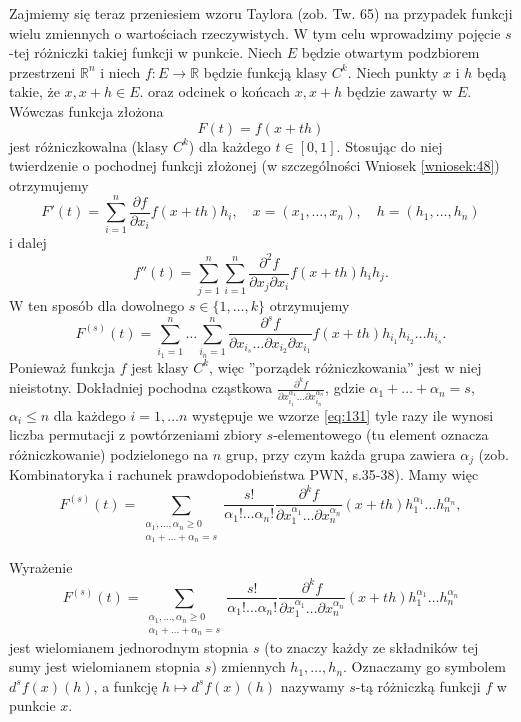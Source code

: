 \documentclass[leqno]{article}
\begin{document}
\begin{justify}
Zajmiemy się teraz przeniesiem wzoru Taylora (zob. Tw. 65) na przypadek funkcji wielu zmiennych o wartościach rzeczywistych. W tym celu wprowadzimy pojęcie $s$-tej różniczki takiej funkcji w punkcie.
Niech $E$ będzie otwartym podzbiorem przestrzeni $\mathbb{R}^n$ i niech $f : E \to \mathbb{R}$ będzie funkcją klasy $C^k$. Niech punkty $x$ i $h$ będą takie, że $x, x+h \in E$.
oraz odcinek o końcach $x,x+h$ będzie zawarty w $E$. Wówczas funkcja złożona 
\[
    F(t) = f(x + th)
\]
jest różniczkowalna (klasy $C^k$) dla każdego $t \in [0,1]$. Stosując do niej twierdzenie o pochodnej funkcji złożonej (w szczególności Wniosek \ref{wniosek:48}) otrzymujemy 
\[
    F'(t) = \sum_{i=1}^{n}\frac{\partial f}{\partial x_i}f(x+th)h_i, \quad x = (x_1, \ldots, x_n), \quad h = (h_1, \ldots, h_n)
\]
i dalej 
\[
    f''(t) = \sum_{j=1}^{n} \sum_{i=1}^{n} \frac{\partial ^2 f}{\partial x_j \partial x_i} f(x+th) h_i h_j.
\]
W ten sposób dla dowolnego $s \in \{1, \ldots, k\}$ otrzymujemy 
\begin{equation}\label{eq:131}
    F^{(s)} (t) = \sum_{i_1 = 1}^{n} \ldots \sum_{i_n = 1}^{n}\frac{\partial ^s f}{\partial x_{i_s} \ldots \partial x_{i_2}\partial x_{i_1}}f(x+th) h_{i_1} h_{i_2} \ldots h_{i_s}.
\end{equation}
Ponieważ funkcja $f$ jest klasy $C^k$, więc ''porządek różniczkowania'' jest w niej nieistotny. Dokładniej pochodna cząstkowa 
$\frac{\partial ^k f}{\partial x_{i_1}^{\alpha_1}\ldots \partial x_{i_{n}}^{\alpha_n}}$, gdzie $\alpha_1 + \ldots + \alpha_n = s$, $\alpha_i \leqslant n$ dla każdego $i = 1, \ldots n$ 
występuje we wzorze \ref{eq:131} tyle razy ile wynosi liczba permutacji z powtórzeniami zbiory $s$-elementowego (tu element oznacza różniczkowanie) podzielonego na $n$ grup,
przy czym każda grupa zawiera $\alpha_j$ (zob. Kombinatoryka i rachunek prawdopodobieństwa PWN, s.35-38). Mamy więc 
\[
    F^{(s)}(t) = \sum_{\substack{\alpha_1, \ldots, \alpha_n \geqslant 0 \\ \alpha_1 + \ldots + \alpha_n = s}}\frac{s!}{\alpha_1! \ldots \alpha_n!}\frac{\partial ^k f}{\partial x_1^{\alpha_1} \ldots \partial x_n^{\alpha_n}}(x+th)h_1^{\alpha_1}\ldots h_n^{\alpha_n},
\]

\begin{defn}
    Wyrażenie 
    \begin{equation}\label{eq:132}
        F^{(s)}(t) = \sum_{\substack{\alpha_1, \ldots, \alpha_n \geqslant 0 \\ \alpha_1 + \ldots + \alpha_n = s}}\frac{s!}{\alpha_1! \ldots \alpha_n!}\frac{\partial ^k f}{\partial x_1^{\alpha_1} \ldots \partial x_n^{\alpha_n}}(x+th)h_1^{\alpha_1}\ldots h_n^{\alpha_n}
    \end{equation}
    jest wielomianem jednorodnym stopnia $s$ (to znaczy każdy ze składników tej sumy jest wielomianem stopnia $s$) zmiennych $h_1, \ldots, h_n$. Oznaczamy go symbolem 
    $d^s f(x)(h)$, a funkcję $h \mapsto d^s f(x)(h)$ nazywamy $s$-tą różniczką funkcji $f$ w punkcie $x$.
\end{defn}


\end{justify}
\end{document}

